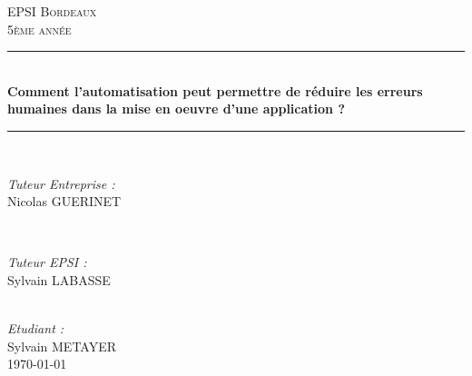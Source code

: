 \begin{titlepage}

\newcommand{\HRule}{\rule{\linewidth}{0.5mm}} %

\center %
 

\textsc{\LARGE EPSI Bordeaux}\\[1.5cm] %
\textsc{\large 5ème année}\\[0.5cm] %
\space

\HRule \\[0.4cm]
{ \huge \bfseries Comment l'automatisation peut permettre de réduire les erreurs humaines dans la mise en oeuvre d'une application ?}\\[0.4cm] %
\HRule \\[1.5cm]

\begin{minipage}{0.4\textwidth}
\begin{flushleft} \large
\emph{Tuteur Entreprise :}\\
Nicolas \textsc{GUERINET} %
\end{flushleft}
\end{minipage}
~
\begin{minipage}{0.4\textwidth}
\begin{flushright} \large
\emph{Tuteur EPSI :} \\
Sylvain \textsc{LABASSE} %
\end{flushright}
\end{minipage}\\[2cm]

\Large \emph{Etudiant :}\\
Sylvain \textsc{METAYER}\\[3cm] %

{\large \today}\\[2cm] %


\end{titlepage}
